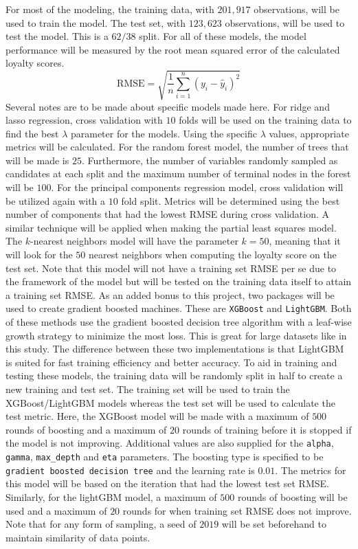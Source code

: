 \documentclass[journal, a4paper]{IEEEtran}
\begin{document}
For most of the modeling, the training data, with $201,917$ observations, will be used to train the model. The test set, with $123,623$ observations, will be used to test the model. This is a $62/38$ split. For all of these models, the model performance will be measured by the root mean squared error of the calculated loyalty scores. $$ \text{RMSE} = \sqrt{\frac{1}{n} \sum_{i=1}^n (y_i - \hat{y}_i)^2} $$ Several notes are to be made about specific models made here. For ridge and lasso regression, cross validation with $10$ folds will be used on the training data to find the best $\lambda$ parameter for the models. Using the specific $\lambda$ values, appropriate metrics will be calculated. For the random forest model, the number of trees that will be made is $25$. Furthermore, the number of variables randomly sampled as candidates at each split and the maximum number of terminal nodes in the forest will be $100$. For the principal components regression model, cross validation will be utilized again with a $10$ fold split. Metrics will be determined using the best number of components that had the lowest RMSE during cross validation. A similar technique will be applied when making the partial least squares model. The $k$-nearest neighbors model will have the parameter $k=50$, meaning that it will look for the $50$ nearest neighbors when computing the loyalty score on the test set. Note that this model will not have a training set RMSE per se due to the framework of the model but will be tested on the training data itself to attain a training set RMSE. As an added bonus to this project, two packages will be used to create gradient boosted machines. These are \texttt{XGBoost} and \texttt{LightGBM}. Both of these methods use the gradient boosted decision tree algorithm with a leaf-wise growth strategy to minimize the most loss. This is great for large datasets like in this study. The difference between these two implementations is that LightGBM is suited for fast training efficiency and better accuracy. To aid in training and testing these models, the training data will be randomly split in half to create a new training and test set. The training set will be used to train the XGBoost/LightGBM models whereas the test set will be used to calculate the test metric. Here, the XGBoost model will be made with a maximum of $500$ rounds of boosting and a maximum of $20$ rounds of training before it is stopped if the model is not improving. Additional values are also supplied for the \texttt{alpha}, \texttt{gamma}, \texttt{max\_depth} and \texttt{eta} parameters. The boosting type is specified to be \texttt{gradient boosted decision tree} and the learning rate is $0.01$. The metrics for this model will be based on the iteration that had the lowest test set RMSE. Similarly, for the lightGBM model, a maximum of $500$ rounds of boosting will be used and a maximum of $20$ rounds for when training set RMSE does not improve. Note that for any form of sampling, a seed of $2019$ will be set beforehand to maintain similarity of data points.
\end{document}

